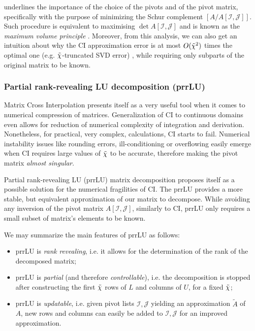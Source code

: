  underlines the importance of the choice of the pivots and of the pivot matrix, specifically with the purpose of minimizing the Schur complement $[A/A[\mathcal{I}, \mathcal{J}]]$. Such procedure is equivalent to maximising $\det{A[\mathcal{I}, \mathcal{J}]}$ and is known as the \textit{maximum volume principle} \cite{Goreinov1997}. Moreover, from this analysis, we can also get an intuition about why the CI approximation error is at most $O({\tilde \chi}^2)$ times the optimal one (e.g. ${\tilde \chi}$-truncated SVD error) \cite{Schneider2010}, while requiring only subparts of the original matrix to be known. 

\subsubsection{Partial rank-revealing LU decomposition (prrLU)}
Matrix Cross Interpolation presents itself as a very useful tool when it comes to numerical compression of matrices. Generalization of CI to continuous domains \cite{Schneider2010, Fernandez2022} even allows for reduction of numerical complexity of integration and derivation. Nonetheless, for practical, very complex, calculations, CI starts to fail. Numerical instability issues like rounding errors, ill-conditioning or overflowing \cite{Golub96} easily emerge when CI requires large values of ${\tilde \chi}$ to be accurate, therefore making the pivot matrix \textit{almost singular}. 

Partial rank-revealing LU (prrLU) \cite{Golub96, Pan2000} matrix decomposition proposes itself as a possible solution for the numerical fragilities of CI. The prrLU provides a more stable, but equivalent approximation of our matrix to decompose. While avoiding any inversion of the pivot matrix $A[\mathcal{I}, \mathcal{J}]$, similarly to CI, prrLU only requires a small subset of matrix's elements to be known. 

We may summarize the main features of prrLU as follows:

\begin{itemize}
	\item prrLU is \textit{rank revealing}, i.e. it allows for the determination of the rank of the decomposed matrix;
	\item prrLU is \textit{partial} (and therefore \textit{controllable}), i.e. the decomposition is stopped after constructing the first ${\tilde \chi}$ rows of $L$ and columns of $U$, for a fixed ${\tilde \chi}$;
	\item prrLU is \textit{updatable}, i.e. given pivot lists $\mathcal{I}, \mathcal{J}$ yielding an approximation $\tilde{A}$ of $A$, new rows and columns can easily be added to $\mathcal{I}, \mathcal{J}$ for an improved approximation. 
\end{itemize}

